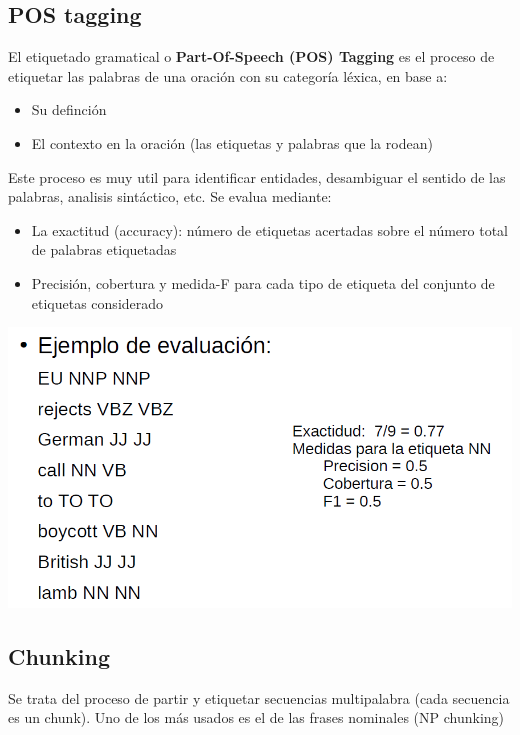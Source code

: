 \documentclass{ctexart}
\begin{document}
	\subsection{POS tagging}
	\begin{flushleft}
		El etiquetado gramatical o \textbf{Part-Of-Speech (POS) Tagging} es el proceso de etiquetar las palabras de una oración con su categoría léxica, en base a:
		\begin{itemize}
			\item Su definción
			\item El contexto en la oración (las etiquetas y palabras que la rodean)
		\end{itemize}
		Este proceso es muy util para identificar entidades, desambiguar el sentido de las palabras, analisis sintáctico, etc. Se evalua mediante:
		\begin{itemize}
			\item La exactitud (accuracy): número de etiquetas acertadas sobre el número total de palabras etiquetadas
			\item Precisión, cobertura y medida-F para cada tipo de	etiqueta del conjunto de etiquetas considerado
		\end{itemize}
		\includegraphics[scale=0.35]{evalpos} \par
	\end{flushleft}
	\subsection{Chunking}
	\begin{flushleft}
		Se trata del proceso de partir y etiquetar secuencias multipalabra (cada secuencia es un chunk). Uno de los más usados es el de las frases nominales (NP chunking)
	\end{flushleft}
\end{document}
